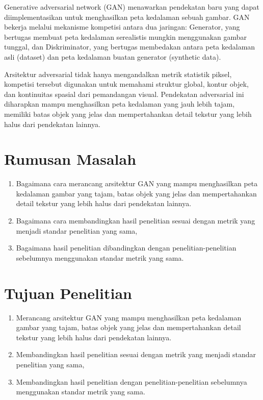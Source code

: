 Generative adversarial network (GAN) menawarkan pendekatan baru yang dapat diimplementasikan untuk menghasilkan peta kedalaman sebuah gambar. GAN bekerja melalui mekanisme kompetisi antara dua jaringan: Generator, yang bertugas membuat peta kedalaman serealistis mungkin menggunakan gambar tunggal, dan Diskriminator, yang bertugas membedakan antara peta kedalaman asli (dataset) dan peta kedalaman buatan generator (synthetic data). 

Arsitektur adversarial tidak hanya mengandalkan metrik statistik piksel, kompetisi tersebut digunakan untuk memahami struktur global, kontur objek, dan kontinuitas spasial dari pemandangan visual. Pendekatan adversarial ini diharapkan mampu menghasilkan peta kedalaman yang jauh lebih tajam, memiliki batas objek yang jelas dan mempertahankan detail tekstur yang lebih halus dari pendekatan lainnya.

\section{Rumusan Masalah}

\begin{enumerate}
    \item Bagaimana cara merancang arsitektur GAN yang mampu menghasilkan peta kedalaman gambar yang tajam, batas objek yang jelas dan mempertahankan detail tekstur yang lebih halus dari pendekatan lainnya.
    \item Bagaimana cara membandingkan hasil penelitian sesuai dengan metrik yang menjadi standar penelitian yang sama,
    \item Bagaimana hasil penelitian dibandingkan dengan penelitian-penelitian sebelumnya menggunakan standar metrik yang sama.
\end{enumerate}

\section{Tujuan Penelitian}

\begin{enumerate}
    \item Merancang arsitektur GAN yang mampu menghasilkan peta kedalaman gambar yang tajam, batas objek yang jelas dan mempertahankan detail tekstur yang lebih halus dari pendekatan lainnya.
    \item Membandingkan hasil penelitian sesuai dengan metrik yang menjadi standar penelitian yang sama,
    \item Membandingkan hasil penelitian dengan penelitian-penelitian sebelumnya menggunakan standar metrik yang sama.
\end{enumerate}